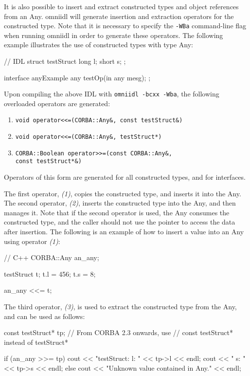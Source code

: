 \documentclass[11pt,twoside,a4paper]{book}
\begin{document}
It is also possible to insert and extract constructed types and object
references from an Any. omniidl will generate insertion and extraction
operators for the constructed type. Note that it is necessary to
specify the \texttt{-WBa} command-line flag when running omniidl in
order to generate these operators. The following example illustrates
the use of constructed types with type Any:

\begin{idllisting}
// IDL
struct testStruct {
  long l;
  short s;
};

interface anyExample {
  any testOp(in any mesg);
};
\end{idllisting}

Upon compiling the above IDL with \texttt{omniidl -bcxx -Wba}, the
following overloaded operators are generated:

\begin{enumerate}
\item \verb|void operator<<=(CORBA::Any&, const testStruct&)|
\item \verb|void operator<<=(CORBA::Any&, testStruct*)|
\item \verb|CORBA::Boolean operator>>=(const CORBA::Any&,|\\
      \verb|const testStruct*&)|
\end{enumerate}

Operators of this form are generated for all constructed types, and
for interfaces.

The first operator, \emph{(1)}, copies the constructed type, and
inserts it into the Any. The second operator, \emph{(2)}, inserts the
constructed type into the Any, and then manages it. Note that if the
second operator is used, the Any consumes the constructed type, and
the caller should not use the pointer to access the data after
insertion. The following is an example of how to insert a value into
an Any using operator \emph{(1)}:

\begin{cxxlisting}
// C++
CORBA::Any an_any;

testStruct t;
t.l = 456;
t.s = 8;

an_any <<= t;
\end{cxxlisting}


The third operator, \emph{(3)}, is used to extract the constructed
type from the Any, and can be used as follows:

\begin{cxxlisting}
const testStruct* tp;   // From CORBA 2.3 onwards, use 
                        // const testStruct* instead of testStruct*

if (an_any >>= tp) {
    cout << "testStruct: l: " << tp->l << endl;
    cout << "            s: " << tp->s << endl;
}
else {
    cout << "Unknown value contained in Any." << endl;
}
\end{cxxlisting}
\end{document}
